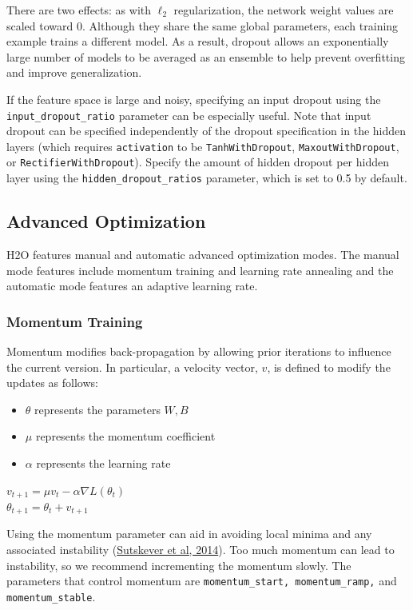 There are two effects: as with $\ell_2$ regularization, the network weight values are scaled toward 0.  Although they share the same global parameters, each training example trains a different model. As a result, dropout allows an exponentially large number of models to be averaged as an ensemble to help prevent overfitting and improve generalization. 

If the feature space is large and noisy, specifying an input dropout using the \texttt{input\_dropout\_ratio} parameter can be especially useful. Note that input dropout can be specified independently of the dropout specification in the hidden layers (which requires \texttt{activation} to be \texttt{TanhWithDropout},  \texttt{MaxoutWithDropout}, or \texttt{RectifierWithDropout}). Specify the amount of hidden dropout per hidden layer using the \texttt{hidden\_dropout\_ratios} parameter, which is set to 0.5 by default.

\subsection{Advanced Optimization} 
H2O features manual and automatic advanced optimization modes. The manual mode features include momentum training and learning rate annealing and the automatic mode features an adaptive learning rate.

\subsubsection{Momentum Training}
\label{sssec:MomentumTraining}
Momentum modifies back-propagation by allowing prior iterations to influence the current version. In particular, a velocity vector, $v$, is defined to modify the updates as follows: 
\begin{itemize}
\item  $\theta$ represents the parameters $W,B$
\item $\mu$ represents the momentum coefficient
\item $\alpha$ represents the learning rate
\end{itemize}

\begin{center}
$v_{t+1} = \mu v_t - \alpha \nabla L(\theta_t)$
\\
$\theta_{t+1} = \theta_t + v_{t+1}$
\end{center}
Using the momentum parameter can aid in avoiding 
local minima and any associated instability (\href{http://www.cs.toronto.edu/~fritz/absps/momentum.pdf}{Sutskever et al, 2014}). Too much momentum can lead to instability, so we recommend incrementing the momentum slowly.  The parameters that control momentum are \texttt{momentum\_start, momentum\_ramp,} and \texttt{momentum\_stable}.

